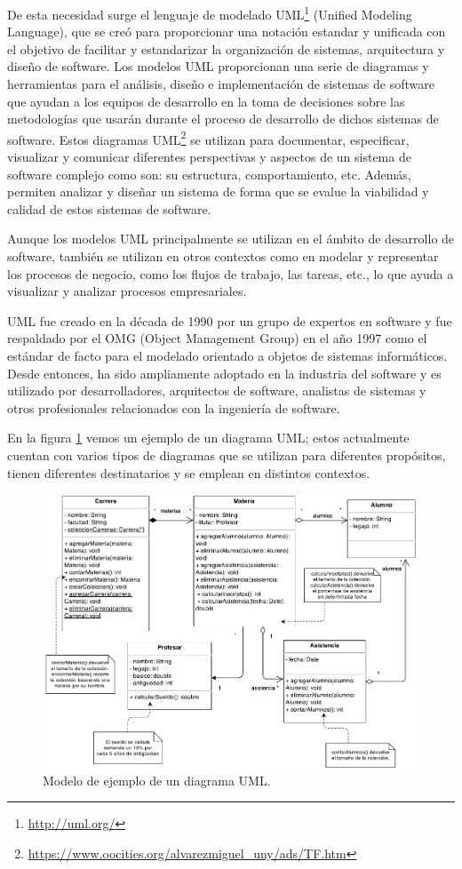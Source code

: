 \documentclass[a4paper, 12pt]{book}
\begin{document}
De esta necesidad surge el lenguaje de modelado UML\footnote{\url{http://uml.org/}} (Unified Modeling Language), que se creó para proporcionar una notación estandar y unificada con el objetivo de facilitar y estandarizar la organización de sistemas, arquitectura y diseño de software.
Los modelos UML proporcionan una serie de diagramas y herramientas para el análisis, diseño e implementación de sistemas de software que ayudan a los equipos de desarrollo en la toma de decisiones sobre las metodologías que usarán durante el proceso de desarrollo de dichos sistemas de software. 
Estos diagramas UML\footnote{\url{https://www.oocities.org/alvarezmiguel_uny/ads/TF.htm}} se utilizan para documentar, especificar, visualizar y comunicar diferentes perspectivas y aspectos de un sistema de software complejo como son: su estructura, comportamiento, etc.
Además, permiten analizar y diseñar un sistema de forma que se evalue la viabilidad y calidad de estos sistemas de software.


Aunque los modelos UML principalmente se utilizan en el ámbito de desarrollo de software, también se utilizan en otros contextos como en modelar y representar los procesos de negocio, como los flujos de trabajo, las tareas, etc., lo que ayuda a visualizar y analizar procesos empresariales.


UML fue creado en la década de 1990 por un grupo de expertos en software y fue respaldado por el OMG (Object Management Group) en el año 1997 como el estándar de facto para el modelado orientado a objetos de sistemas informáticos. 
Desde entonces, ha sido ampliamente adoptado en la industria del software y es utilizado por desarrolladores, arquitectos de software, analistas de sistemas y otros profesionales relacionados con la ingeniería de software. 


En la figura \ref{fig:diagrama-uml} vemos un ejemplo de un diagrama UML; estos actualmente cuentan con varios tipos de diagramas que se utilizan para diferentes propósitos, tienen diferentes destinatarios y se emplean en distintos contextos.


\begin{figure}
  \centering
  \includegraphics[width=16cm, keepaspectratio]{img/Diagrama-uml.png}
  \caption{Modelo de ejemplo de un diagrama UML.}\label{fig:diagrama-uml}
\end{figure}
\end{document}
